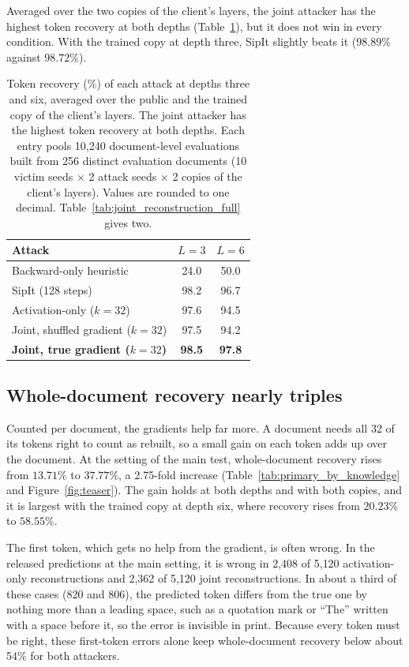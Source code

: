\documentclass[11pt]{article}
\newcommand{\keyresult}[1]{\textbf{\textcolor{resultcol}{#1}}}
\begin{document}
Averaged over the two copies of the client's layers, the joint attacker has the highest token recovery at both depths (Table~\ref{tab:joint_reconstruction}), but it does not win in every condition. With the trained copy at depth three, SipIt slightly beats it ($98.89\%$ against $98.72\%$).

\begin{table}[H]
\centering
\begin{tabular}{lcc}
\toprule
\textbf{Attack} & \textbf{$L=3$} & \textbf{$L=6$} \\
\midrule
Backward-only heuristic & 24.0 & 50.0 \\
SipIt (128 steps) & 98.2 & 96.7 \\
Activation-only ($k{=}32$) & 97.6 & 94.5 \\
Joint, shuffled gradient ($k{=}32$) & 97.5 & 94.2 \\
\textbf{Joint, true gradient ($k{=}32$)} & \keyresult{98.5} & \keyresult{97.8} \\
\bottomrule
\end{tabular}
\caption{Token recovery (\%) of each attack at depths three and six, averaged over the public and the trained copy of the client's layers. The joint attacker has the highest token recovery at both depths. Each entry pools 10{,}240 document-level evaluations built from 256 distinct evaluation documents (10 victim seeds $\times$ 2 attack seeds $\times$ 2 copies of the client's layers). Values are rounded to one decimal. Table~\ref{tab:joint_reconstruction_full} gives two.}
\label{tab:joint_reconstruction}
\end{table}

\subsection{Whole-document recovery nearly triples}
Counted per document, the gradients help far more. A document needs all 32 of its tokens right to count as rebuilt, so a small gain on each token adds up over the document. At the setting of the main test, whole-document recovery rises from $13.71\%$ to $37.77\%$, a 2.75-fold increase (Table~\ref{tab:primary_by_knowledge} and Figure~\ref{fig:teaser}). The gain holds at both depths and with both copies, and it is largest with the trained copy at depth six, where recovery rises from $20.23\%$ to $58.55\%$.

The first token, which gets no help from the gradient, is often wrong. In the released predictions at the main setting, it is wrong in 2{,}408 of 5{,}120 activation-only reconstructions and 2{,}362 of 5{,}120 joint reconstructions. In about a third of these cases (820 and 806), the predicted token differs from the true one by nothing more than a leading space, such as a quotation mark or ``The'' written with a space before it, so the error is invisible in print. Because every token must be right, these first-token errors alone keep whole-document recovery below about 54\% for both attackers.
\end{document}
